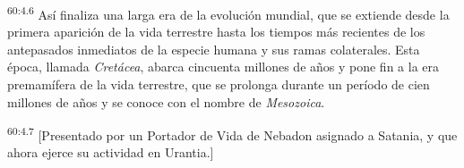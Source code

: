 \par
\textsuperscript{60:4.6} Así finaliza una larga era de la evolución mundial, que se extiende desde la primera aparición de la vida terrestre hasta los tiempos más recientes de los antepasados inmediatos de la especie humana y sus ramas colaterales. Esta época, llamada \textit{Cretácea}, abarca cincuenta millones de años y pone fin a la era premamífera de la vida terrestre, que se prolonga durante un período de cien millones de años y se conoce con el nombre de \textit{Mesozoica}.

\par
\textsuperscript{60:4.7} [Presentado por un Portador de Vida de Nebadon asignado a Satania, y que ahora ejerce su actividad en Urantia.]